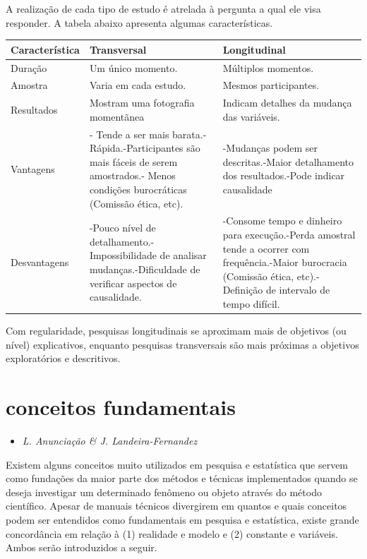 \documentclass[
]{book}
\providecommand{\tightlist}{%
  \setlength{\itemsep}{0pt}\setlength{\parskip}{0pt}}
\begin{document}
A realização de cada tipo de estudo é atrelada à pergunta a qual ele visa responder. A tabela abaixo apresenta algumas características.

\begin{longtable}[]{@{}
  >{\raggedright\arraybackslash}p{}
  >{\raggedright\arraybackslash}p{}
  >{\raggedright\arraybackslash}p{}@{}}
\toprule
Característica & Transversal & Longitudinal \\
\midrule
\endhead
Duração & Um único momento. & Múltiplos momentos. \\
Amostra & Varia em cada estudo. & Mesmos participantes. \\
Resultados & Mostram uma fotografia momentãnea & Indicam detalhes da mudança das variáveis. \\
Vantagens & - Tende a ser mais barata.-Rápida.-Participantes são mais fáceis de serem amostrados.- Menos condições burocráticas (Comissão ética, etc). & -Mudanças podem ser descritas.-Maior detalhamento dos resultados.-Pode indicar causalidade \\
Desvantagens & -Pouco nível de detalhamento.-Impossibilidade de analisar mudanças.-Dificuldade de verificar aspectos de causalidade. & -Consome tempo e dinheiro para execução.-Perda amostral tende a ocorrer com frequência.-Maior burocracia (Comissão ética, etc).-Definição de intervalo de tempo difícil. \\
\bottomrule
\end{longtable}

Com regularidade, pesquisas longitudinais se aproximam mais de objetivos (ou nível) explicativos, enquanto pesquisas transversais são mais próximas a objetivos exploratórios e descritivos.

\hypertarget{conceitos-fundamentais}{%
\section{conceitos fundamentais}\label{conceitos-fundamentais}}

\begin{itemize}
\tightlist
\item
  \emph{L. Anunciação \& J. Landeira-Fernandez}
\end{itemize}

Existem alguns conceitos muito utilizados em pesquisa e estatística que servem como fundações da maior parte dos métodos e técnicas implementados quando se deseja investigar um determinado fenômeno ou objeto através do método científico. Apesar de manuais técnicos divergirem em quantos e quais conceitos podem ser entendidos como fundamentais em pesquisa e estatística, existe grande concordância em relação à (1) realidade e modelo e (2) constante e variáveis. Ambos serão introduzidos a seguir.
\end{document}
